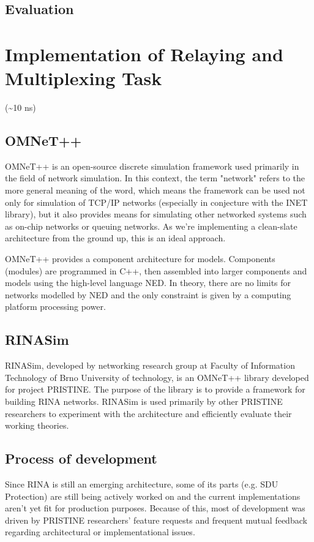     \section{Evaluation}

\chapter{Implementation of Relaying and Multiplexing Task}
    (\textasciitilde10 ns)
    \section{OMNeT++}
        OMNeT++ is an open-source discrete simulation framework used primarily in the field of network simulation. In this context, the term "network" refers to the more general meaning of the word, which means the framework can be used not only for simulation of TCP/IP networks (especially in conjecture with the INET library), but it also provides means for simulating other networked systems such as on-chip networks or queuing networks. As we're implementing a clean-slate architecture from the ground up, this is an ideal approach.

        OMNeT++ provides a component architecture for models. Components (modules) are programmed in C++, then assembled into larger components and models using the high-level language NED. In theory, there are no limits for networks modelled by NED and the only constraint is given by a computing platform processing power.

    \section{RINASim}
        RINASim, developed by networking research group at Faculty of Information Technology of Brno University of technology, is an OMNeT++ library developed for project PRISTINE. The purpose of the library is to provide a framework for building RINA networks. RINASim is used primarily by other PRISTINE researchers to experiment with the architecture and efficiently evaluate their working theories.

    \section{Process of development}
        Since RINA is still an emerging architecture, some of its parts (e.g. SDU Protection) are still being actively worked on and the current implementations aren't yet fit for production purposes. Because of this, most of development was driven by PRISTINE researchers' feature requests and frequent mutual feedback regarding architectural or implementational issues.

